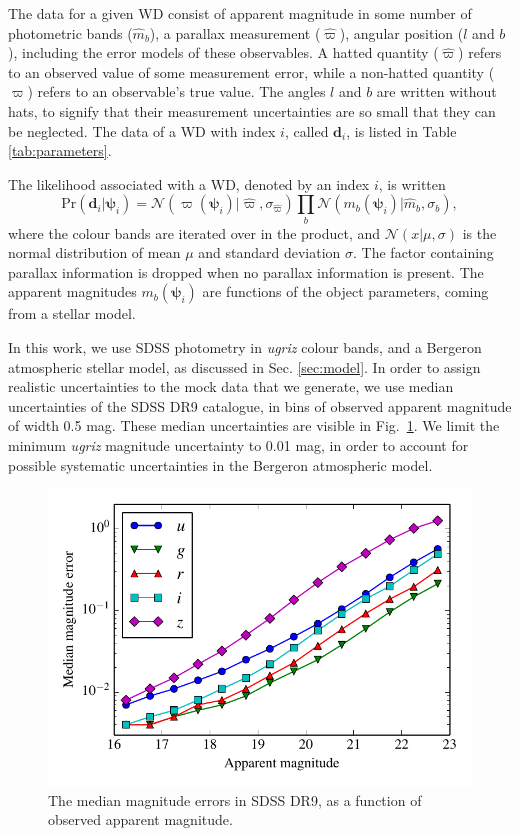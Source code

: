 \documentclass[fleqn,usenatbib]{mnras}
\newcommand{\objp}{\boldsymbol{\psi}}
\newcommand{\data}{\mathbf{d}}
\newcommand{\pr}{\text{Pr}}
\begin{document}
The data for a given WD consist of apparent magnitude in some number of photometric bands ($\hat{m}_b$), a parallax measurement ($\hat{\varpi}$), angular position ($l$ and $b$), including the error models of these observables. A hatted quantity ($\hat{\varpi}$) refers to an observed value of some measurement error, while a non-hatted quantity ($\varpi$) refers to an observable's true value. The angles $l$ and $b$ are written without hats, to signify that their measurement uncertainties are so small that they can be neglected. The data of a WD with index $i$, called $\data_i$, is listed in Table \ref{tab:parameters}.

The likelihood associated with a WD, denoted by an index $i$, is written
\begin{equation}\label{eq:likelihood}
	\pr(\data_i | \objp_i) = \mathcal{N}(\varpi(\objp_i)|\hat{\varpi},\sigma_{\hat{\varpi}})\prod_{b} \mathcal{N}(m_b(\objp_i)|\hat{m}_b,\sigma_b),
\end{equation}
where the colour bands are iterated over in the product, and $\mathcal{N}(x | \mu,\sigma)$ is the normal distribution of mean $\mu$ and standard deviation $\sigma$. The factor containing parallax information is dropped when no parallax information is present. The apparent magnitudes $m_b(\objp_i)$ are functions of the object parameters, coming from a stellar model.

In this work, we use SDSS photometry in \emph{ugriz} colour bands, and a Bergeron atmospheric stellar model, as discussed in Sec. \ref{sec:model}. In order to assign realistic uncertainties to the mock data that we generate, we use median uncertainties of the SDSS DR9 catalogue, in bins of observed apparent magnitude of width 0.5 mag. These median uncertainties are visible in Fig.~\ref{fig:magnitude_error}. We limit the minimum \emph{ugriz} magnitude uncertainty to 0.01 mag, in order to account for possible systematic uncertainties in the Bergeron atmospheric model.

\begin{figure}
	\includegraphics[width=\columnwidth]{median_app_errors.pdf}
    \caption{The median magnitude errors in SDSS DR9, as a function of observed apparent magnitude.}
    \label{fig:magnitude_error}
\end{figure}
\end{document}
